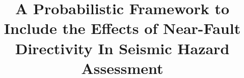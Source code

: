 \documentclass[12pt]{report}
\title{A Probabilistic Framework to Include the Effects of Near-Fault Directivity In Seismic Hazard Assessment}
\begin{document}

















\begin{appendices}
\titleformat{\chapter}{\headingfont\LARGE\bfseries}{\appendixname \hspace{3.3pt} \thechapter}{1em}{}




\end{appendices}

% 
% 

\end{document}
